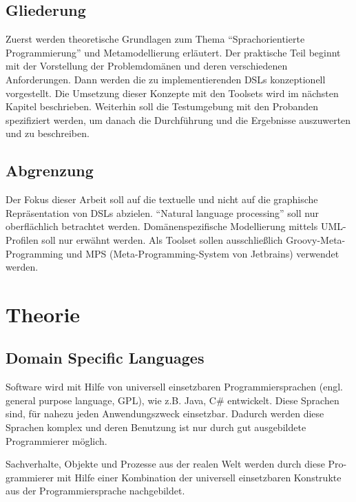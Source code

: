 \documentclass[11pt,english,ngerman, headsepline]{scrreprt}
\begin{document}
\section{Gliederung}

Zuerst werden theoretische Grundlagen zum Thema “Sprachorientierte
Programmierung” und Metamodellierung erläutert. Der praktische Teil beginnt mit
der Vorstellung der Problemdomänen und deren verschiedenen Anforderungen. Dann
werden die zu implementierenden DSLs konzeptionell vorgestellt. Die Umsetzung
dieser Konzepte mit den Toolsets wird im nächsten Kapitel beschrieben. Weiterhin
soll die Testumgebung mit den Probanden spezifiziert werden, um danach die
Durchführung und die Ergebnisse auszuwerten und zu beschreiben.



\section{Abgrenzung}
Der Fokus dieser Arbeit soll auf die textuelle und nicht auf die graphische
Repräsentation von DSLs abzielen. “Natural language processing” soll nur
oberflächlich betrachtet werden. Domänenspezifische Modellierung mittels
UML-Profilen soll nur erwähnt werden. Als Toolset sollen
ausschließlich Groovy-Meta-Programming und MPS (Meta-Programming-System von
Jetbrains) verwendet werden.

\chapter{Theorie}

\section{Domain Specific Languages}
 
 
Software wird mit Hilfe von universell einsetzbaren Programmiersprachen  (engl.
general purpose language, GPL), wie z.B. Java, C\# entwickelt. Diese Sprachen
sind, für nahezu jeden Anwendungszweck einsetzbar.
Dadurch werden diese Sprachen komplex und deren Benutzung ist nur durch gut
ausgebildete Programmierer möglich.



Sachverhalte, Objekte und Prozesse aus der realen Welt werden durch diese Pro-
grammierer mit Hilfe einer Kombination der universell einsetzbaren Konstrukte
aus der Programmiersprache nachgebildet. 
\end{document}
